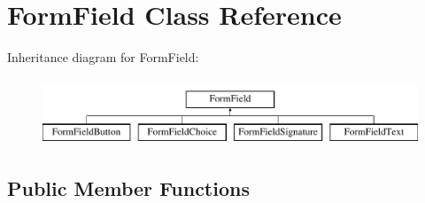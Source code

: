 \hypertarget{class_form_field}{}\section{Form\+Field Class Reference}
\label{class_form_field}
Inheritance diagram for Form\+Field\+:\begin{figure}[H]
\begin{center}
\leavevmode
\includegraphics[height=2.000000cm]{class_form_field}
\end{center}
\end{figure}
\subsection*{Public Member Functions}
